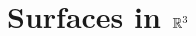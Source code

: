 \documentclass[../main]{subfiles}
\begin{document}
\chapter{Surfaces in \texorpdfstring{$\mathbb{R}^3$}{R^3}}\label{ch03}







\end{document}
